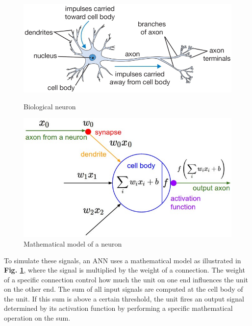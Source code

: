 \begin{figure}
    \begin{minipage}{0.5\textwidth}
        \centering
            \includegraphics[width=1\textwidth]{fig/neuron}
            \caption{Biological neuron\cite{cs231n_part1}}
            \label{fig1}
    \end{minipage}
    \begin{minipage}{0.4\textwidth}
        \centering
            \includegraphics[width=1\textwidth]{fig/neuron_model}
            \caption{Mathematical model of a neuron\cite{cs231n_part1}}
            \label{fig2}
    \end{minipage}
\end{figure}

\noindent To simulate these signals, an ANN uses a mathematical model as illustrated in \textbf{Fig. \ref{fig2}}, where the signal is multiplied by the weight of a connection. The weight of a specific connection control how much the unit on one end influences the unit on the other end. The sum of all input signals are computed at the cell body of the unit. If this sum is above a certain threshold, the unit fires an output signal determined by its activation function by performing a specific mathematical operation on the sum.

